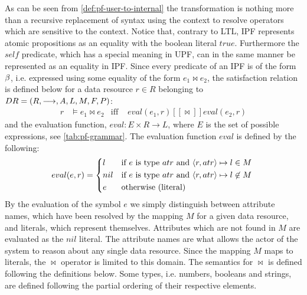 As can be seen from \autoref{def:pf-user-to-internal} the transformation is nothing more than a recursive replacement of syntax using the context to resolve operators which are sensitive to the context. Notice that, contrary to LTL, IPF represents atomic propositions as an equality with the boolean literal $true$. Furthermore the $self$ predicate, which has a special meaning in UPF, can in the same manner be represented as an equality in IPF. Since every predicate of an IPF is of the form $\beta$, i.e. expressed using some equality of the form $e_1 \bowtie e_2$, the satisfaction relation is defined below for a data resource $r \in R$ belonging to $DR= \left( R, \longrightarrow, A, L, M, F, P \right)$:
\begin{align*}
    r &\models e_1 \bowtie e_2 &\text{iff }& eval(e_1, r) [\![ \bowtie ]\!] eval(e_2, r)
\end{align*}
and the evaluation function, $eval : E \times R \rightarrow L$, where $E$ is the set of possible expressions, see \autoref{tab:pf-grammar}. The evaluation function $eval$ is defined by the following:
\begin{align*}
    eval(e,r) =
    \begin{cases*}
        l   & if $e$ is type $atr$ and $\langle r,atr\rangle \mapsto l \in M$ \\
        nil & if $e$ is type $atr$ and $\langle r,atr\rangle \mapsto l \not\in M$ \\
        e         & otherwise (literal)
    \end{cases*}
\end{align*}
By the evaluation of the symbol $e$ we simply distinguish between attribute names, which have been resolved by the mapping $M$ for a given data resource, and literals, which represent themselves. Attributes which are not found in $M$ are evaluated as the $nil$ literal. The attribute names are what allows the actor of the system to reason about any single data resource. Since the mapping $M$ maps to literals, the $\bowtie$ operator is limited to this domain. The semantics for $\bowtie$ is defined following the definitions below. Some types, i.e. numbers, booleans and strings, are defined following the partial ordering of their respective elements.
